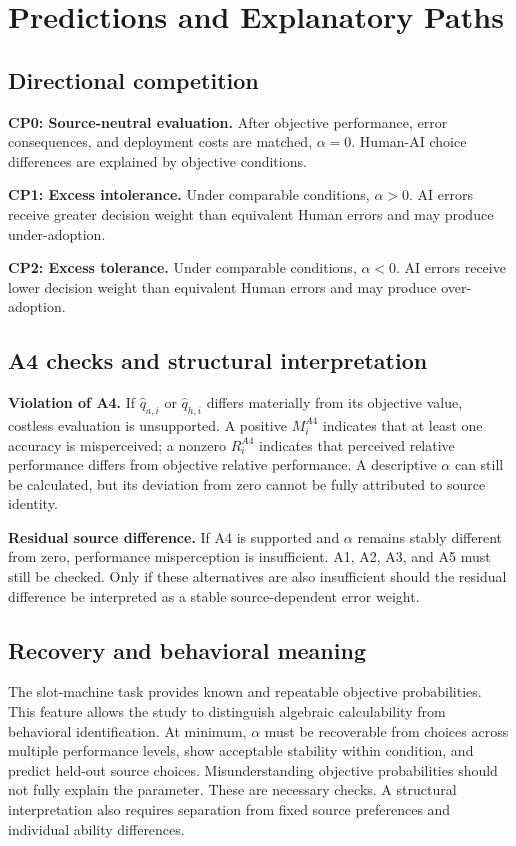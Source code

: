 \documentclass[11pt,a4paper]{article}
\newcommand{\condition}[1]{\textbf{#1}}
\begin{document}
\section{Predictions and Explanatory Paths}

\subsection{Directional competition}

\condition{CP0: Source-neutral evaluation.} After objective performance, error consequences, and deployment costs are matched, $\alpha=0$. Human-AI choice differences are explained by objective conditions.

\condition{CP1: Excess intolerance.} Under comparable conditions, $\alpha>0$. AI errors receive greater decision weight than equivalent Human errors and may produce under-adoption.

\condition{CP2: Excess tolerance.} Under comparable conditions, $\alpha<0$. AI errors receive lower decision weight than equivalent Human errors and may produce over-adoption.

\subsection{A4 checks and structural interpretation}

\condition{Violation of A4.} If $\widehat q_{a,i}$ or $\widehat q_{h,i}$ differs materially from its objective value, costless evaluation is unsupported. A positive $M_i^{A4}$ indicates that at least one accuracy is misperceived; a nonzero $R_i^{A4}$ indicates that perceived relative performance differs from objective relative performance. A descriptive $\alpha$ can still be calculated, but its deviation from zero cannot be fully attributed to source identity.

\condition{Residual source difference.} If A4 is supported and $\alpha$ remains stably different from zero, performance misperception is insufficient. A1, A2, A3, and A5 must still be checked. Only if these alternatives are also insufficient should the residual difference be interpreted as a stable source-dependent error weight.

\subsection{Recovery and behavioral meaning}

The slot-machine task provides known and repeatable objective probabilities. This feature allows the study to distinguish algebraic calculability from behavioral identification. At minimum, $\alpha$ must be recoverable from choices across multiple performance levels, show acceptable stability within condition, and predict held-out source choices. Misunderstanding objective probabilities should not fully explain the parameter. These are necessary checks. A structural interpretation also requires separation from fixed source preferences and individual ability differences.
\end{document}
